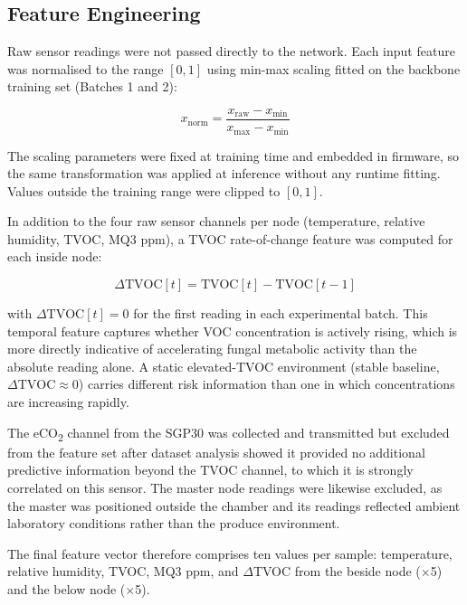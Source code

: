 \subsection{Feature Engineering}

Raw sensor readings were not passed directly to the network. Each input feature was normalised to the range $[0, 1]$ using min-max scaling fitted on the backbone training set (Batches 1 and 2):

\begin{equation}
    x_{\text{norm}} = \frac{x_{\text{raw}} - x_{\text{min}}}{x_{\text{max}} - x_{\text{min}}}
    \label{eq:minmax}
\end{equation}

The scaling parameters were fixed at training time and embedded in firmware, so the same transformation was applied at inference without any runtime fitting. Values outside the training range were clipped to $[0, 1]$.

In addition to the four raw sensor channels per node (temperature, relative humidity, TVOC, MQ3 ppm), a TVOC rate-of-change feature was computed for each inside node:

\begin{equation}
    \Delta\text{TVOC}[t] = \text{TVOC}[t] - \text{TVOC}[t-1]
    \label{eq:delta_tvoc}
\end{equation}

with $\Delta\text{TVOC}[t] = 0$ for the first reading in each experimental batch. This temporal feature captures whether VOC concentration is actively rising, which is more directly indicative of accelerating fungal metabolic activity than the absolute reading alone. A static elevated-TVOC environment (stable baseline, $\Delta\text{TVOC} \approx 0$) carries different risk information than one in which concentrations are increasing rapidly.

The eCO\textsubscript{2} channel from the SGP30 was collected and transmitted but excluded from the feature set after dataset analysis showed it provided no additional predictive information beyond the TVOC channel, to which it is strongly correlated on this sensor. The master node readings were likewise excluded, as the master was positioned outside the chamber and its readings reflected ambient laboratory conditions rather than the produce environment.

The final feature vector therefore comprises ten values per sample: temperature, relative humidity, TVOC, MQ3 ppm, and $\Delta$TVOC from the beside node ($\times$5) and the below node ($\times$5).

